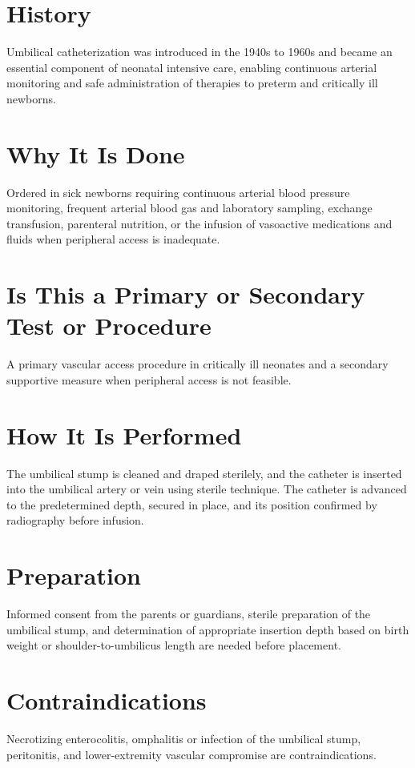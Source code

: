 \section*{History}
Umbilical catheterization was introduced in the 1940s to 1960s and became an essential component of neonatal intensive care, enabling continuous arterial monitoring and safe administration of therapies to preterm and critically ill newborns.

\section*{Why It Is Done}
Ordered in sick newborns requiring continuous arterial blood pressure monitoring, frequent arterial blood gas and laboratory sampling, exchange transfusion, parenteral nutrition, or the infusion of vasoactive medications and fluids when peripheral access is inadequate.

\section*{Is This a Primary or Secondary Test or Procedure}
A primary vascular access procedure in critically ill neonates and a secondary supportive measure when peripheral access is not feasible.

\section*{How It Is Performed}
The umbilical stump is cleaned and draped sterilely, and the catheter is inserted into the umbilical artery or vein using sterile technique. The catheter is advanced to the predetermined depth, secured in place, and its position confirmed by radiography before infusion.

\section*{Preparation}
Informed consent from the parents or guardians, sterile preparation of the umbilical stump, and determination of appropriate insertion depth based on birth weight or shoulder-to-umbilicus length are needed before placement.

\section*{Contraindications}
Necrotizing enterocolitis, omphalitis or infection of the umbilical stump, peritonitis, and lower-extremity vascular compromise are contraindications.

